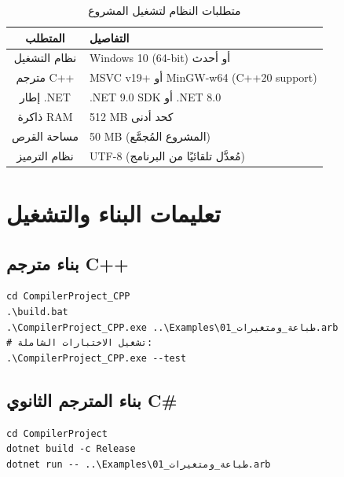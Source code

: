 \documentclass[12pt,a4paper]{report}
\begin{document}
\begin{table}[H]
\caption{\arabicfont متطلبات النظام لتشغيل المشروع}
\label{tab:requirements}
\centering
\begin{tabular}{|c|l|}
\hline
\rowcolor{TableHead}
\textbf{\arabicfont المتطلب} & \textbf{\arabicfont التفاصيل} \\
\hline
\arabicfont نظام التشغيل & Windows 10 (64-bit) أو أحدث \\
\hline
\rowcolor{TableAlt}
\arabicfont مترجم C++ & MSVC v19+ أو MinGW-w64 (C++20 support) \\
\hline
\arabicfont إطار .NET & .NET 9.0 SDK أو .NET 8.0 \\
\hline
\rowcolor{TableAlt}
\arabicfont ذاكرة RAM & 512 MB كحد أدنى \\
\hline
\arabicfont مساحة القرص & 50 MB (المشروع المُجمَّع) \\
\hline
\rowcolor{TableAlt}
\arabicfont نظام الترميز & UTF-8 (مُعدَّل تلقائيًا من البرنامج) \\
\hline
\end{tabular}
\end{table}

\section{تعليمات البناء والتشغيل}

\subsection{بناء مترجم C++}
\begin{CodeBox}[]
\begin{lstlisting}[basicstyle=\ttfamily\small]
cd CompilerProject_CPP
.\build.bat
.\CompilerProject_CPP.exe ..\Examples\01_طباعة_ومتغيرات.arb
# تشغيل الاختبارات الشاملة:
.\CompilerProject_CPP.exe --test
\end{lstlisting}
\end{CodeBox}

\subsection{بناء المترجم الثانوي C\#}
\begin{CodeBox}[]
\begin{lstlisting}[basicstyle=\ttfamily\small]
cd CompilerProject
dotnet build -c Release
dotnet run -- ..\Examples\01_طباعة_ومتغيرات.arb
\end{lstlisting}
\end{CodeBox}
\end{document}
